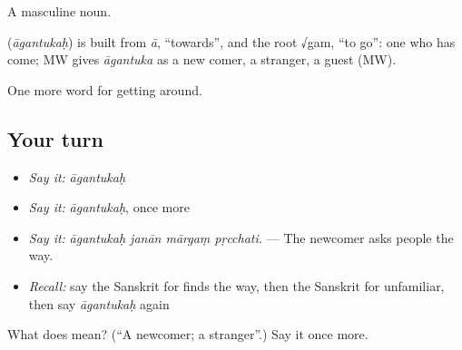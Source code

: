 A masculine noun.

\begin{cousinweb}
\textbf{} (\emph{āgantukaḥ}) is built from \emph{ā}, \textquotedblleft{}towards\textquotedblright{}, and the root √gam, \textquotedblleft{}to go\textquotedblright{}: one who has come; MW gives \emph{āgantuka} as a new comer, a stranger, a guest (MW).
\end{cousinweb}

\begin{grammarlens}[title={What you've built}]
One more word for getting around.
\end{grammarlens}

\subsection*{Your turn}
\begin{itemize}
\raggedright
  \item \emph{Say it:} \emph{āgantukaḥ}
  \item \emph{Say it:} \emph{āgantukaḥ}, once more
  \item \emph{Say it:} \emph{āgantukaḥ janān mārgaṃ pṛcchati.} — The newcomer asks people the way.
  \item \emph{Recall:} say the Sanskrit for finds the way, then the Sanskrit for unfamiliar, then say \emph{āgantukaḥ} again
\end{itemize}

\begin{tcolorbox}[breakable,colback=teal!4,colframe=teal!35!black,title={Before you move on}]
What does  mean? (\textquotedblleft{}A newcomer; a stranger\textquotedblright{}.) Say it once more.
\end{tcolorbox}
